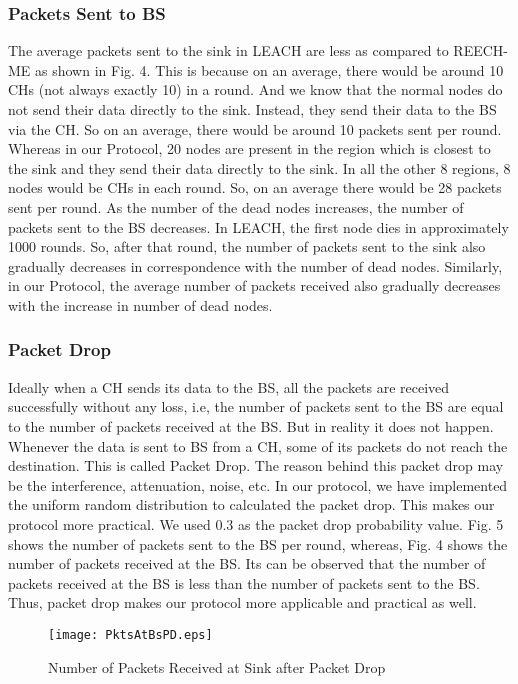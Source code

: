 \documentclass[journal]{IEEEtran}
\begin{document}
\subsubsection{Packets Sent to BS}
The average packets sent to the sink in LEACH are less as compared to REECH-ME as shown in Fig. 4. This is because on an average, there would be around 10 CHs (not always exactly 10) in a round. And we know that the normal nodes do not send their data directly to the sink. Instead, they send their data to the BS via the CH. So on an average, there would be around 10 packets sent per round. Whereas in our Protocol, 20 nodes are present in the region which is closest to the sink and they send their data directly to the sink. In all the other 8 regions, 8 nodes would be CHs in each round. So, on an average there would be 28 packets sent per round. As the number of the dead nodes increases, the number of packets sent to the BS decreases. In LEACH, the first node dies in approximately 1000 rounds. So, after that round, the number of packets sent to the sink also gradually decreases in correspondence with the number of dead nodes. Similarly, in our Protocol, the average number of packets received also gradually decreases with the increase in number of dead nodes.

\subsubsection{Packet Drop}
Ideally when a CH sends its data to the BS, all the packets are received successfully without any loss, i.e, the number of packets sent to the BS are equal to the number of packets received at the BS. But in reality it does not happen. Whenever the data is sent to BS from a CH, some of its packets do not reach the destination. This is called Packet Drop. The reason behind this packet drop may be the interference, attenuation, noise, etc. In our protocol, we have implemented the uniform random distribution to calculated the packet drop. This makes our protocol more practical. We used 0.3 as the packet drop probability value. Fig. 5 shows the number of packets sent to the BS per round, whereas, Fig. 4 shows the number of packets received at the BS. Its can be observed that the number of packets received at the BS is less than the number of packets sent to the BS. Thus, packet drop makes our protocol more applicable and practical as well.

\begin{figure}[!h]
\centering
\texttt{[image: PktsAtBsPD.eps]}
\caption{Number of Packets Received at Sink after Packet Drop}
\end{figure}
\end{document}
